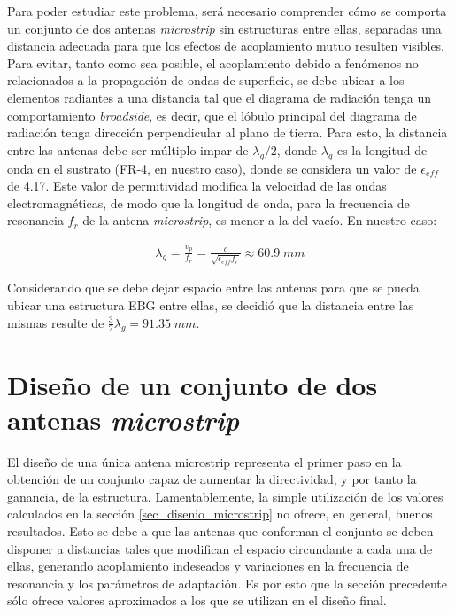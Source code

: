 Para poder estudiar este problema, será necesario comprender cómo se comporta un conjunto de dos antenas \textit{microstrip} sin estructuras entre ellas, separadas una distancia adecuada para que los efectos de acoplamiento mutuo resulten visibles. Para evitar, tanto como sea posible, el acoplamiento debido a fenómenos no relacionados a la propagación de ondas de superficie, se debe ubicar a los elementos radiantes a una distancia tal que el diagrama de radiación tenga un comportamiento \textit{broadside}, es decir, que el lóbulo principal del diagrama de radiación tenga dirección perpendicular al plano de tierra. Para esto, la distancia entre las antenas debe ser múltiplo impar de $\lambda_g/2$, donde $\lambda_g$ es la longitud de onda en el sustrato (FR-4, en nuestro caso), donde se considera un valor de $\epsilon_{eff}$ de 4.17. Este valor de permitividad modifica la velocidad de las ondas electromagnéticas, de modo que la longitud de onda, para la frecuencia de resonancia $f_r$ de la antena \textit{microstrip}, es menor a la del vacío. En nuestro caso:

\begin{align}
	\label{eq:lambdag}
	\lambda_g = \frac{v_p}{f_r} = \frac{c}{\sqrt{\epsilon_{eff} f_r}} \approx 60.9\; mm
\end{align}

Considerando que se debe dejar espacio entre las antenas para que se pueda ubicar una estructura EBG entre ellas, se decidió que la distancia entre las mismas resulte de $\frac{3}{2} \lambda_g = 91.35\;mm$.






\section{Diseño de un conjunto de dos antenas \textit{microstrip}}
\label{sec_conjunto}
El diseño de una única antena microstrip representa el primer paso en la obtención de un conjunto capaz de aumentar la directividad, y por tanto la ganancia, de la estructura. Lamentablemente, la simple utilización de los valores calculados en la sección \ref{sec_disenio_microstrip} no ofrece, en general, buenos resultados. Esto se debe a que las antenas que conforman el conjunto se deben disponer a distancias tales que modifican el espacio circundante a cada una de ellas, generando acoplamiento indeseados y variaciones en la frecuencia de resonancia y los parámetros de adaptación. Es por esto que la sección precedente sólo ofrece valores aproximados a los que se utilizan en el diseño final.

